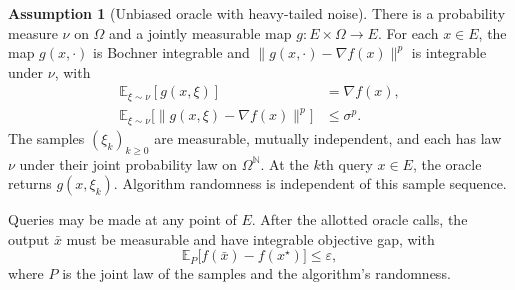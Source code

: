\documentclass[10pt]{article}
\theoremstyle{definition}
\newtheorem{assumption}{Assumption}
\begin{document}
\begin{assumption}[Unbiased oracle with heavy-tailed noise]
There is a probability measure $\nu$ on $\Omega$ and a jointly measurable map $g:E\times\Omega\to E$. For each $x\in E$, the map $g(x,\cdot)$ is Bochner integrable and $\|g(x,\cdot)-\nabla f(x)\|^p$ is integrable under $\nu$, with
\[
\begin{aligned}
\mathbb{E}_{\xi\sim\nu}[g(x,\xi)]&=\nabla f(x),\\
\mathbb{E}_{\xi\sim\nu}\bigl[\|g(x,\xi)-\nabla f(x)\|^p\bigr]&\leq\sigma^p.
\end{aligned}
\]
The samples $(\xi_k)_{k\geq0}$ are measurable, mutually independent, and each has law $\nu$ under their joint probability law on $\Omega^{\mathbb{N}}$. At the $k$th query $x\in E$, the oracle returns $g(x,\xi_k)$. Algorithm randomness is independent of this sample sequence.
\end{assumption}

Queries may be made at any point of $E$. After the allotted oracle calls, the output $\bar{x}$ must be measurable and have integrable objective gap, with
\[
\mathbb{E}_{P}\bigl[f(\bar{x})-f(x^\star)\bigr]\leq\varepsilon,
\]
where $P$ is the joint law of the samples and the algorithm's randomness.
\end{document}
